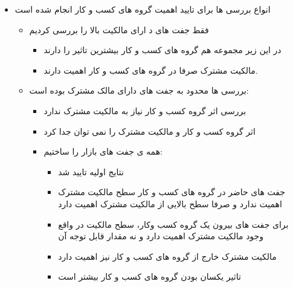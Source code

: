\documentclass[12pt, a4paper]{article}
\begin{document}
\begin{itemize}
\item 
انواع بررسی ها برای تایید اهمیت گروه های کسب و کار انجام شده است 
\begin{itemize}

\item
فقط جفت  های د ارای مالکیت بالا را بررسی کردیم
\begin{itemize}
\item 
در این زیر مجموعه هم گروه های کسب و کار بیشترین تاثیر را دارند 
\item
مالکیت مشترک صرفا در گروه های کسب و کار اهمیت دارند.

\end{itemize}
\item
بررسی ها محدود به جفت های دارای مالک مشترک بوده است:
\begin{itemize}
\item
بررسی اثر گروه کسب و کار نیاز به مالکیت مشترک ندارد
\item
اثر گروه کسب و کار و مالکیت مشترک را نمی توان جدا کرد
\item 
همه ی جفت های بازار را ساختیم:
\begin{itemize}
\item
نتایج اولیه تایید شد
\item 
جفت های حاضر در گروه های کسب و کار سطح مالکیت مشترک اهمیت ندارد و صرفا سطح بالایی از مالکیت مشترک اهمیت دارد
\item
برای جفت های بیرون یک گروه کسب وکار، سطح مالکیت در واقع وجود مالکیت مشترک اهمیت دارد و نه مقدار قابل توجه آن
\item
مالکیت مشترک خارج از گروه های کسب و کار نیز اهمیت دارد
\item
تاثیر یکسان بودن گروه های کسب و کار بیشتر است
\end{itemize}
\end{itemize}

\end{itemize}




\end{itemize}
\end{document}
